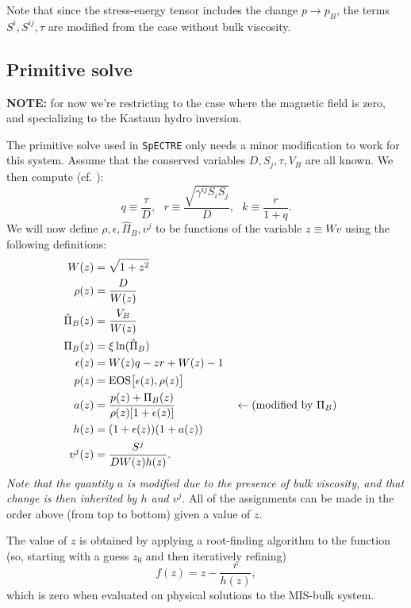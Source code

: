 \documentclass[12pt]{article}
\numberwithin{equation}{section}
\begin{document}
Note that since the stress-energy tensor includes the change $p \to p_B$, the terms $S^i, S^{ij}, \tau$ are modified from the case without bulk viscosity.

\subsection{Primitive solve}

\textbf{NOTE:} for now we're restricting to the case where the magnetic field is zero, and specializing to the Kastaun hydro inversion.

The primitive solve used in {\tt SpECTRE} only needs a minor modification to work for this system.
Assume that the conserved variables $D, S_j, \tau, V_B$ are all known.
We then compute (cf. \cite{Galeazzi13}):
\begin{equation}
	q \equiv \frac{\tau}{D}, ~~~ r \equiv \frac{\sqrt{\gamma^{ij} S_i S_j}}{D}, ~~~ k \equiv \frac{r}{1 + q}.
\end{equation}
We will now define $\rho, \epsilon, \hat{\Pi}_B, v^j$ to be functions of the variable $z \equiv W v$ using the following definitions:
\begin{equation}
\begin{aligned}
W(z) &= \sqrt{1 + z^2} \\
\rho(z) &= \frac{D}{W(z)} \\
\hat{\Pi}_B(z) &= \frac{V_B}{W(z)} \\
\Pi_B(z) &= \xi \ln(\hat{\Pi}_B) \\
\epsilon(z) &= W(z) q - z r + W(z) - 1 \\
p(z) &= \mathrm{EOS}\big[ \epsilon(z), \rho(z) \big] \\
a(z) &= \frac{p(z) + \Pi_B(z)}{\rho(z) [1 + \epsilon(z)]} &&\leftarrow (\textnormal{modified by } \Pi_B) \\
h(z) &= (1 + \epsilon(z))(1 + a(z)) \\
v^j(z) &= \frac{S^j}{D W(z) h(z)}.
\end{aligned}
\end{equation}
\textit{Note that the quantity $a$ is modified due to the presence of bulk viscosity, and that change is then inherited by $h$ and $v^j$}.
All of the assignments can be made in the order above (from top to bottom) given a value of $z$.

The value of $z$ is obtained by applying a root-finding algorithm to the function (so, starting with a guess $z_0$ and then iteratively refining)
\begin{equation}
f(z) = z - \frac{r}{h(z)},
\end{equation}
which is zero when evaluated on physical solutions to the MIS-bulk system.
\end{document}
